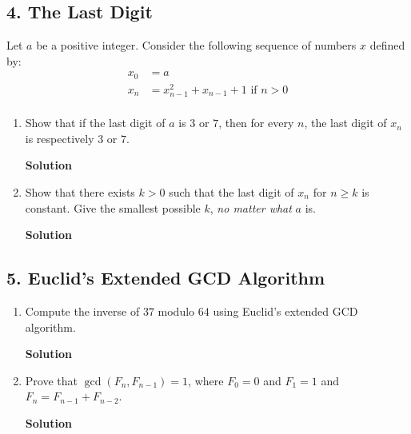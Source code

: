 \documentclass{article}\usepackage{amsmath,amssymb,amsthm,tikz,tkz-graph,color,chngpage,soul,hyperref,csquotes,graphicx,floatrow}\newcommand*{\QEDB}{\hfill\ensuremath{\square}}\newtheorem*{prop}{Proposition}\renewcommand{\theenumi}{\alph{enumi}}\usepackage[shortlabels]{enumitem}\usepackage[nobreak=true]{mdframed}\usetikzlibrary{matrix,calc}\MakeOuterQuote{"}\usepackage[margin=0.75in]{geometry}
\begin{document}
\subsection*{4. The Last Digit}
Let $a$ be a positive integer. Consider the following sequence of numbers $x$ defined by:
\begin{align*}
x_0 &= a \\
x_n &= x_{n-1}^2+x_{n-1}+1\text{  if  }n>0 \\
\end{align*}
\begin{enumerate}
\item Show that if the last digit of $a$ is $3$ or $7$, then for every $n$, the last digit of $x_n$ is respectively $3$ or $7$.
\begin{mdframed}
\textbf{Solution}

\end{mdframed}
\item Show that there exists $k>0$ such that the last digit of $x_n$ for $n\geqslant k$ is constant. Give the smallest possible $k$, \textit{no matter what} $a$ is.
\begin{mdframed}
\textbf{Solution}

\end{mdframed}
\end{enumerate}
\clearpage


\subsection*{5. Euclid's Extended GCD Algorithm}
\begin{enumerate}
\item Compute the inverse of $37$ modulo $64$ using Euclid's extended GCD algorithm.
\begin{mdframed}
\textbf{Solution}

\end{mdframed}
\item Prove that $\gcd\left(F_n,F_{n-1}\right)=1$, where $F_0=0$ and $F_1=1$ and $F_n=F_{n-1}+F_{n-2}$.
\begin{mdframed}
\textbf{Solution}

\end{mdframed}
\end{enumerate}
\clearpage

\end{document}
